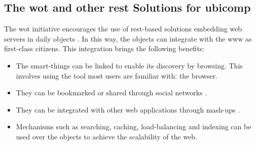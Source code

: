 \subsection{The \acl{wot} and other \ac{rest} Solutions for \acs{ubicomp}}



The \acl{wot} initiative encourages the use of \acs{rest}-based solutions embedding web servers in daily objects \citep{guinard_internet_2011}.
In this way, the objects can integrate with the \ac{www} as first-class citizens. %
This integration brings the following benefits:
\begin{itemize}
  \item The smart-things can be linked to enable its discovery by browsing. This involves using the tool most users are familiar with: the browser.
  \item They can be bookmarked or shared through social networks \citep{guinard_sharing_2010}.
  \item They can be integrated with other web applications through mash-ups \citep{guinard_towards_2009,ostermaier_webplug:_2010,pintus_anatomy_2011}.
  \item Mechanisms such as searching, caching, load-balancing and indexing can be used over the objects to achieve the scalability of the web. %
\end{itemize}


